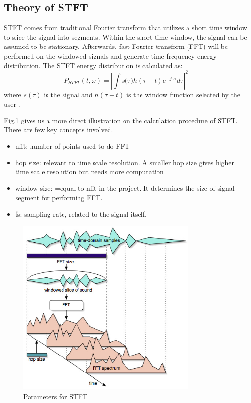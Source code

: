 \documentclass[11pt,letter]{article}
\begin{document}
\subsection{Theory of STFT}
STFT comes from traditional Fourier transform that utilizes a short time window to slice the signal into segments. Within the short time window, the signal can be assumed to be stationary. Afterwards, fast Fourier transform (FFT) will be performed on the windowed signals and generate time frequency energy distribution. The STFT energy distribution is calculated as:
\[ P_{STFT}(t,\omega) = { \left| \int { s(\tau  } )h(\tau -t){ e }^{ -j\omega \tau  }d\tau  \right|  }^{ 2 } \]
where $s(\tau)$ is the signal and $h(\tau -t)$ is the window function selected by the user \cite{leon1995time}.

Fig.\ref{stft_explanation} gives us a more direct illustration on the calculation procedure of STFT. There are few key concepts involved.

\begin{itemize}
\item nfft: number of points used to do FFT
\item hop size: relevant to time scale resolution. A smaller hop size gives higher time scale resolution but needs more computation
\item window size: =equal to nfft in the project. It determines the size of signal segment for performing FFT.
\item fs: sampling rate, related to the signal itself.
\end{itemize}

\begin{figure}[H]
\centering
\includegraphics[width = 0.8\textwidth]{fig/stft_explanation.jpg}
\caption{Parameters for STFT \cite{ThePh65:online} }
\label{stft_explanation}
\end{figure}
\end{document}
